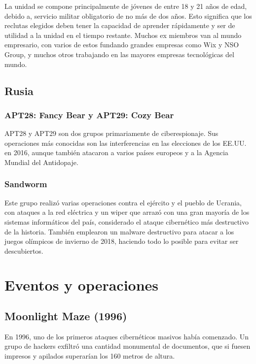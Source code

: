 \documentclass{article}
\begin{document}
La unidad se compone principalmente de jóvenes de entre 18 y 21 años de edad, debido a, servicio militar obligatorio de no más de dos años. Esto significa que los reclutas elegidos deben tener la capacidad de aprender rápidamente y ser de utilidad a la unidad en el tiempo restante. Muchos ex miembros van al mundo empresario, con varios de estos fundando grandes empresas como Wix y NSO Group, y muchos otros trabajando en las mayores empresas tecnológicas del mundo. \autocite{globes-unit-8200} \autocite{forbes-unit-8200}

\subsection{Rusia}
\subsubsection{APT28: Fancy Bear y APT29: Cozy Bear}
APT28 y APT29 son dos grupos primariamente de ciberespionaje. Sus operaciones más conocidas son las interferencias en las elecciones de los EE.UU. en 2016, aunque también atacaron a varios países europeos y a la Agencia Mundial del Antidopaje. \autocite{sslstore-apt28-apt29}

\subsubsection{Sandworm}
Este grupo realizó varias operaciones contra el ejército y el pueblo de Ucrania, con ataques a la red eléctrica y un wiper que arrazó con una gran mayoría de los sistemas informáticos del país, considerado el ataque cibernético más destructivo de la historia. También emplearon un malware destructivo para atacar a los juegos olímpicos de invierno de 2018, haciendo todo lo posible para evitar ser descubiertos. \autocite{wired-notpetya} \autocite{wired-olympic-destroyer}


\section{Eventos y operaciones}

\subsection{Moonlight Maze (1996)}
En 1996, uno de los primeros ataques cibernéticos masivos había comenzado. Un grupo de hackers exfiltró una cantidad monumental de documentos, que si fuesen impresos y apilados superarían los 160 metros de altura. \autocite{securelist-moonlight-maze}
\end{document}
